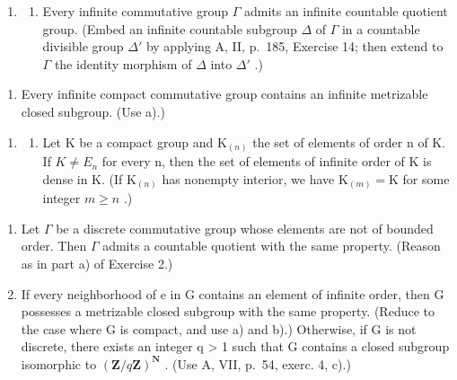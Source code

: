 \begin{enumerate}
\def\labelenumi{\arabic{enumi})}
\setcounter{enumi}{1}
\tightlist
\item
  \begin{enumerate}
  \def\labelenumii{\alph{enumii})}
  \tightlist
  \item
    Every infinite commutative group \(\Gamma\) admits an infinite countable quotient group. (Embed an infinite countable subgroup \(\Delta\) of \(\Gamma\) in a countable divisible group \(\Delta'\) by applying A, II, p.~185, Exercise 14; then extend to \(\Gamma\) the identity morphism of \(\Delta\) into \(\Delta'\) .)
  \end{enumerate}
\end{enumerate}

\begin{enumerate}
\def\labelenumi{\alph{enumi})}
\setcounter{enumi}{1}
\tightlist
\item
  Every infinite compact commutative group contains an infinite metrizable closed subgroup. (Use a).)
\end{enumerate}

\begin{enumerate}
\def\labelenumi{\arabic{enumi})}
\setcounter{enumi}{2}
\tightlist
\item
  \begin{enumerate}
  \def\labelenumii{\alph{enumii})}
  \tightlist
  \item
    Let K be a compact group and \(\mathrm{K}_{(n)}\) the set of elements of order n of K. If \(K \neq E_{n}\) for every n, then the set of elements of infinite order of K is dense in K. (If \(\mathrm{K}_{(n)}\) has nonempty interior, we have \(\mathrm{K}_{(m)} = \mathrm{K}\) for some integer \(m \geqslant n\) .)
  \end{enumerate}
\end{enumerate}

\begin{enumerate}
\def\labelenumi{\alph{enumi})}
\setcounter{enumi}{1}
\item
  Let \(\Gamma\) be a discrete commutative group whose elements are not of bounded order. Then \(\Gamma\) admits a countable quotient with the same property. (Reason as in part a) of Exercise 2.)
\item
  If every neighborhood of e in G contains an element of infinite order, then G possesses a metrizable closed subgroup with the same property. (Reduce to the case where G is compact, and use a) and b).) Otherwise, if G is not discrete, there exists an integer q \textgreater{} 1 such that G contains a closed subgroup isomorphic to \((\mathbf{Z}/q\mathbf{Z})^{\mathbf{N}}\) . (Use A, VII, p.~54, exerc. 4, c).)
\end{enumerate}

